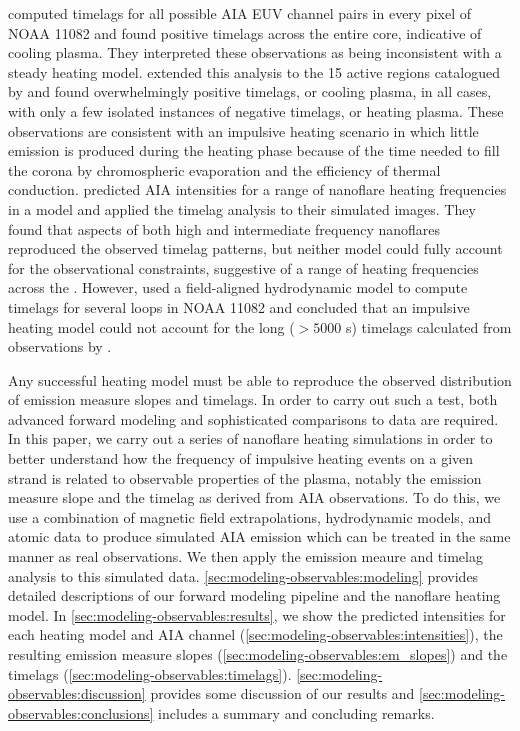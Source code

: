\citet{viall_evidence_2012} computed timelags for all possible AIA EUV channel pairs in every pixel of \AR{} NOAA 11082 and found positive timelags across the entire \AR{} core, indicative of cooling plasma. They interpreted these observations as being inconsistent with a steady heating model. \citet{viall_survey_2017} extended this analysis to the 15 active regions catalogued by \citet{warren_systematic_2012} and found overwhelmingly positive timelags, or cooling plasma, in all cases, with only a few isolated instances of negative timelags, or heating plasma. These observations are consistent with an impulsive heating scenario in which little emission is produced during the heating phase because of the time needed to fill the corona by chromospheric evaporation and the efficiency of thermal conduction. \citet{bradshaw_patterns_2016} predicted AIA intensities for a range of nanoflare heating frequencies in a model \AR{} and applied the timelag analysis to their simulated images. They found that aspects of both high and intermediate frequency nanoflares reproduced the observed timelag patterns, but neither model could fully account for the observational constraints, suggestive of a range of heating frequencies across the \AR{}. However, \citet{lionello_can_2016} used a field-aligned hydrodynamic model to compute timelags for several loops in NOAA 11082 and concluded that an impulsive heating model could not account for the long ($>5000$ s) timelags calculated from observations by \citet{viall_evidence_2012}.

Any successful heating model must be able to reproduce the observed distribution of emission measure slopes and timelags. In order to carry out such a test, both advanced forward modeling and sophisticated comparisons to data are required. In this paper, we carry out a series of nanoflare heating simulations in order to better understand how the frequency of impulsive heating events on a given strand is related to observable properties of the plasma, notably the emission measure slope and the timelag as derived from AIA observations. To do this, we use a combination of magnetic field extrapolations, hydrodynamic models, and atomic data to produce simulated AIA emission which can be treated in the same manner as real observations. We then apply the emission meaure and timelag analysis to this simulated data. \autoref{sec:modeling-observables:modeling} provides detailed descriptions of our forward modeling pipeline and the nanoflare heating model. In \autoref{sec:modeling-observables:results}, we show the predicted intensities for each heating model and AIA channel (\autoref{sec:modeling-observables:intensities}), the resulting emission measure slopes (\autoref{sec:modeling-observables:em_slopes}) and the timelags (\autoref{sec:modeling-observables:timelags}). \autoref{sec:modeling-observables:discussion} provides some discussion of our results and \autoref{sec:modeling-observables:conclusions} includes a summary and concluding remarks.

